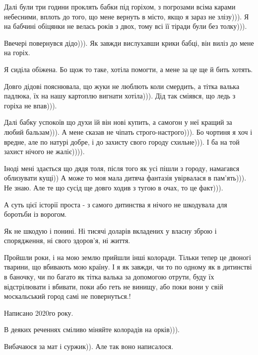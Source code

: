 Далі були три години проклять бабки під горіхом, з погрозами всіма карами
небесними, вплоть до того, що мене вернуть в місто, якщо я зараз не злізу))). Я
на бабчині обіцянки не велась років з двох, тому всі її тіради були без
толку))).

Ввечері повернувся дідо))). Як завжди вислухавши крики бабці, він виліз до мене
на горіх.

Я сиділа обіжена. Бо щож то таке, хотіла помогти, а мене за це ще й бить
хотять.

Довго дідові пояснювала, що жуки не люблють коли смердить, а тітка валька
падлюка, їх на нашу картоплю вигнати хотіла))). Дід так сміявся, що ледь з
горіха не впав))).

Далі бабку успокоїв що духи їй він нові купить, а самогон у неї кращий за любий
бальзам))). А мене сказав не чіпать строго-настрого))). Бо чортиня я хоч і
вредне, але по натурі добре, і до захисту свого городу схильне))). І ба на той
захист нічого не жаліє)))).

Іноді мені здається що дядя толя, після того як усі пішли з городу, намагався
облизувати кущі)) А може то моя мала дитяча фантазія увірвалася в пам'ять))).
Не знаю. Але те що сусід ще довго ходив з тугою в очах, то це факт))). 

А суть цієї історії проста - з самого дитинства я нічого не шкодувала для
боротьби із ворогом.

Як не шкодую і понині. Ні тисячі доларів вкладених у власну зброю і
спорядження, ні свого здоров'я, ні  життя.

Пройшли роки, і на мою землю прийшли інші колоради. Тільки тепер це двоногі
тварини, що вбивають мою країну. І я як завжди, чи то по одному як в дитинстві
в баночку, чи по багато як тітка валька за допомогою отрути, буду їх
відстрілювати і вбивати, поки або геть не винищу, або поки вони у свій
москальський город самі не повернуться.!

Написано 2020го року.

В деяких реченнях сміливо міняйте колорадів на орків))). 

Вибачаюся за мат і суржик)). Але так воно написалося.
